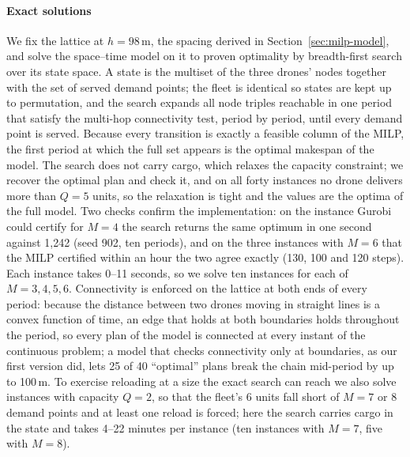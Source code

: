 \documentclass[final,5p,times,twocolumn]{elsarticle}
\begin{document}
\paragraph{Exact solutions}
We fix the lattice at $h = 98$\,m, the spacing derived in Section~\ref{sec:milp-model}, and solve
the space--time model on it to proven optimality by breadth-first search over its state space. A
state is the multiset of the three drones' nodes together with the set of served demand points;
the fleet is identical so states are kept up to permutation, and the search expands all node
triples reachable in one period that satisfy the multi-hop connectivity test, period by period,
until every demand point is served. Because every transition is exactly a feasible column of the
MILP, the first period at which the full set appears is the optimal makespan of the model. The
search does not carry cargo, which relaxes the capacity constraint; we recover the optimal plan
and check it, and on all forty instances no drone delivers more than $Q = 5$ units, so the
relaxation is tight and the values are the optima of the full model. Two checks confirm the
implementation: on the instance Gurobi could certify for $M = 4$ the search returns the same
optimum in one second against 1{,}242 (seed 902, ten periods), and on the three instances with
$M = 6$ that the MILP certified within an hour the two agree exactly (130, 100 and 120 steps).
Each instance takes 0--11 seconds, so we solve ten instances for each of $M = 3, 4, 5, 6$.
Connectivity is enforced on the lattice at both ends of every period: because the distance
between two drones moving in straight lines is a convex function of time, an edge that holds at
both boundaries holds throughout the period, so every plan of the model is connected at every
instant of the continuous problem; a model that checks connectivity only at boundaries, as our
first version did, lets 25 of 40 ``optimal'' plans break the chain mid-period by up to 100\,m.
To exercise reloading at a size the exact search can reach we also solve instances with
capacity $Q = 2$, so that the fleet's 6 units fall short of $M = 7$ or $8$ demand points and at
least one reload is forced; here the search carries cargo in the state and takes 4--22 minutes per
instance (ten instances with $M = 7$, five with $M = 8$).
\end{document}
